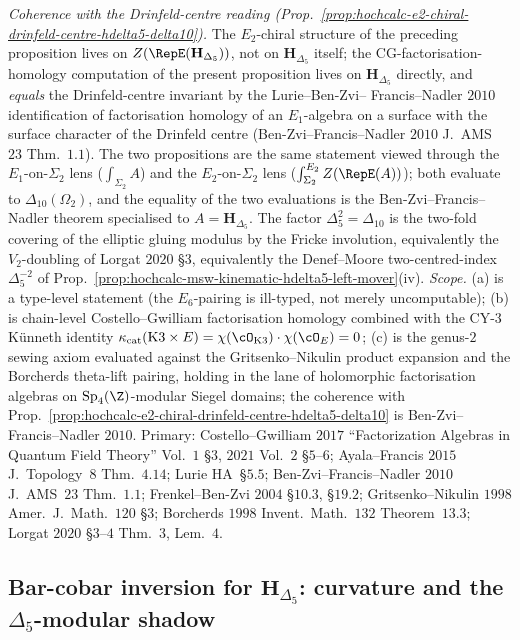 \begin{proposition}
\emph{Coherence with the Drinfeld-centre reading
(Prop.~\ref{prop:hochcalc-e2-chiral-drinfeld-centre-hdelta5-delta10}).}
The $E_2$-chiral structure of the preceding proposition lives on
$Z(\RepE(\mathbf H_{\Delta_5}))$, not on $\mathbf H_{\Delta_5}$ itself;
the CG-factorisation-homology computation of the present
proposition lives on $\mathbf H_{\Delta_5}$ directly, and
\emph{equals} the Drinfeld-centre invariant by the Lurie--Ben-Zvi--
Francis--Nadler $2010$ identification of factorisation homology of
an $E_1$-algebra on a surface with the surface character of the
Drinfeld centre (Ben-Zvi--Francis--Nadler $2010$ J.\ AMS~$23$
Thm.\ $1.1$). The two propositions are the same statement viewed
through the $E_1$-on-$\Sigma_2$ lens ($\int_{\Sigma_2}A$) and the
$E_2$-on-$\Sigma_2$ lens ($\int_{\Sigma_2}^{E_2}Z(\RepE(A))$); both
evaluate to $\Delta_{10}(\Omega_2)$, and the equality of the two
evaluations is the Ben-Zvi--Francis--Nadler theorem specialised to
$A=\mathbf H_{\Delta_5}$. The factor $\Delta_5^2=\Delta_{10}$ is
the two-fold covering of the elliptic gluing modulus by the
Fricke involution, equivalently the $V_2$-doubling of Lorgat $2020$
\S$3$, equivalently the Denef--Moore two-centred-index
$\Delta_5^{-2}$ of
Prop.~\ref{prop:hochcalc-msw-kinematic-hdelta5-left-mover}(iv).
\emph{Scope.} (a) is a type-level statement (the $E_6$-pairing is
ill-typed, not merely uncomputable); (b) is chain-level
Costello--Gwilliam factorisation homology combined with the
CY-$3$ K\"unneth identity $\kappa_{\mathrm{cat}}(\mathrm{K3}\times E)=\chi(\cO_{\mathrm{K3}})\cdot\chi(\cO_E)=0$; (c) is the genus-$2$
sewing axiom evaluated against the Gritsenko--Nikulin product
expansion and the Borcherds theta-lift pairing, holding in the
lane of holomorphic factorisation algebras on
$\mathrm{Sp}_4(\Z)$-modular Siegel domains; the coherence with
Prop.~\ref{prop:hochcalc-e2-chiral-drinfeld-centre-hdelta5-delta10}
is Ben-Zvi--Francis--Nadler $2010$. Primary:
Costello--Gwilliam $2017$ ``Factorization Algebras in Quantum
Field Theory'' Vol.\ $1$ \S$3$, $2021$ Vol.\ $2$ \S$5$--$6$;
Ayala--Francis $2015$ J.\ Topology~$8$ Thm.\ $4.14$;
Lurie HA~\S$5.5$; Ben-Zvi--Francis--Nadler $2010$ J.\ AMS~$23$
Thm.\ $1.1$; Frenkel--Ben-Zvi $2004$ \S$10.3$, \S$19.2$;
Gritsenko--Nikulin $1998$ Amer.\ J.\ Math.\ $120$ \S$3$;
Borcherds $1998$ Invent.\ Math.\ $132$ Theorem~$13.3$;
Lorgat $2020$ \S$3$--$4$ Thm.\ $3$, Lem.\ $4$.
\end{proposition}

\subsection{Bar-cobar inversion for \texorpdfstring{$\mathbf H_{\Delta_5}$}{H-Delta-5}: curvature and the \texorpdfstring{$\Delta_5$}{Delta-5}-modular shadow}
\label{subsec:hochcalc-hdelta5-bar-cobar-inversion}

